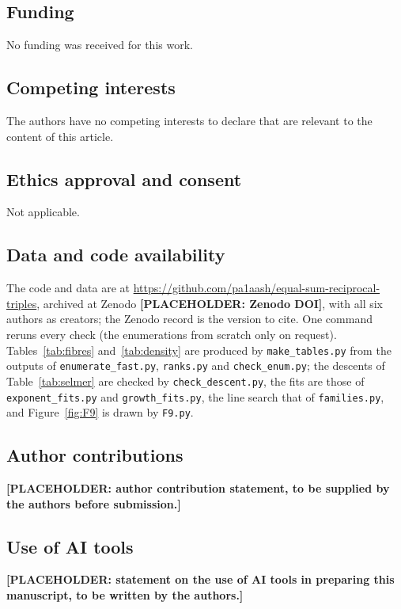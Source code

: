 \documentclass[11pt]{amsart}
\theoremstyle{definition}
\theoremstyle{remark}
\begin{document}
\subsection*{Funding}
No funding was received for this work.

\subsection*{Competing interests}
The authors have no competing interests to declare that are relevant to the content of this article.

\subsection*{Ethics approval and consent}
Not applicable.

\subsection*{Data and code availability}
{\sloppy The code and data are at \url{https://github.com/pa1aash/equal-sum-reciprocal-triples}, archived at Zenodo \textbf{[PLACEHOLDER: Zenodo DOI]}, with all six authors as creators; the Zenodo record is the version to cite. One command reruns every check (the enumerations from scratch only on request). Tables~\ref{tab:fibres} and~\ref{tab:density} are produced by \texttt{make\_tables.py} from the outputs of \texttt{enumerate\_fast.py}, \texttt{ranks.py} and \texttt{check\_enum.py}; the descents of Table~\ref{tab:selmer} are checked by \texttt{check\_descent.py}, the fits are those of \texttt{exponent\_fits.py} and \texttt{growth\_fits.py}, the line search that of \texttt{families.py}, and Figure~\ref{fig:F9} is drawn by \texttt{F9.py}.\par}

\subsection*{Author contributions}
\textbf{[PLACEHOLDER: author contribution statement, to be supplied by the authors before submission.]}

\subsection*{Use of AI tools}
\textbf{[PLACEHOLDER: statement on the use of AI tools in preparing this manuscript, to be written by the authors.]}



\end{document}
